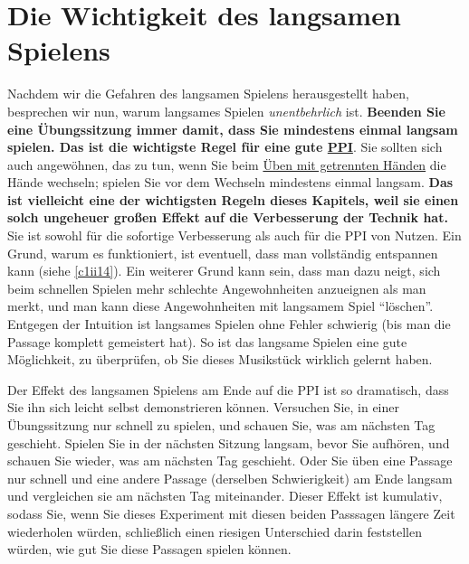 
\section{Die Wichtigkeit des langsamen Spielens}
\label{c1ii17}

Nachdem wir die Gefahren des langsamen Spielens herausgestellt haben, besprechen wir nun, warum langsames Spielen \textit{unentbehrlich} ist.
\textbf{Beenden Sie eine Übungssitzung immer damit, dass Sie mindestens einmal langsam spielen.
Das ist die wichtigste Regel für eine gute \hyperref[c1ii15]{PPI}}.
Sie sollten sich auch angewöhnen, das zu tun, wenn Sie beim \hyperref[c1ii7]{Üben mit getrennten Händen} die Hände wechseln; spielen Sie vor dem Wechseln mindestens einmal langsam.
\textbf{Das ist vielleicht eine der wichtigsten Regeln dieses Kapitels, weil sie einen solch ungeheuer großen Effekt auf die Verbesserung der Technik hat.}
Sie ist sowohl für die sofortige Verbesserung als auch für die PPI von Nutzen.
Ein Grund, warum es funktioniert, ist eventuell, dass man vollständig entspannen kann (siehe \hyperref[c1ii14]{\ref*{c1ii14}}).
Ein weiterer Grund kann sein, dass man dazu neigt, sich beim schnellen Spielen mehr schlechte Angewohnheiten anzueignen als man merkt, und man kann diese Angewohnheiten mit langsamem Spiel \enquote{löschen}.
Entgegen der Intuition ist langsames Spielen ohne Fehler schwierig (bis man die Passage komplett gemeistert hat).
So ist das langsame Spielen eine gute Möglichkeit, zu überprüfen, ob Sie dieses Musikstück wirklich gelernt haben.

Der Effekt des langsamen Spielens am Ende auf die PPI ist so dramatisch, dass Sie ihn sich leicht selbst demonstrieren können.
Versuchen Sie, in einer Übungssitzung nur schnell zu spielen, und schauen Sie, was am nächsten Tag geschieht.
Spielen Sie in der nächsten Sitzung langsam, bevor Sie aufhören, und schauen Sie wieder, was am nächsten Tag geschieht.
Oder Sie üben eine Passage nur schnell und eine andere Passage (derselben Schwierigkeit) am Ende langsam und vergleichen sie am nächsten Tag miteinander.
Dieser Effekt ist kumulativ, sodass Sie, wenn Sie dieses Experiment mit diesen beiden Passsagen längere Zeit wiederholen würden, schließlich einen riesigen Unterschied darin feststellen würden, wie gut Sie diese Passagen spielen können.

